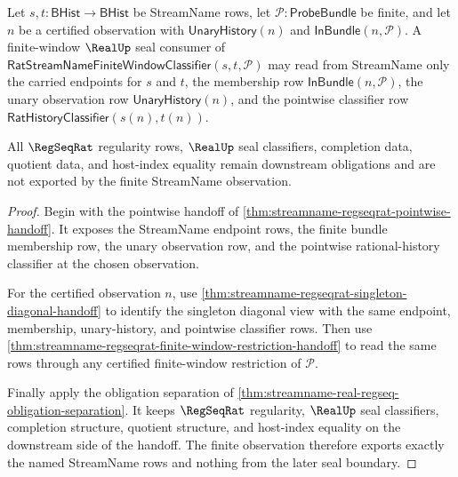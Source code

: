 \begin{theorem}
\label{thm:streamname-finite-observation-realup-seal-scope}
Let $s,t:\mathsf{BHist}\to\mathsf{BHist}$ be StreamName rows, let
$\mathcal P:\mathsf{ProbeBundle}$ be finite, and let $n$ be a certified
observation with $\mathsf{UnaryHistory}(n)$ and
$\mathsf{InBundle}(n,\mathcal P)$. A finite-window $\RealUp$ seal consumer of
$\mathsf{RatStreamNameFiniteWindowClassifier}(s,t,\mathcal P)$ may read from
StreamName only the carried endpoints for $s$ and $t$, the membership row
$\mathsf{InBundle}(n,\mathcal P)$, the unary observation row
$\mathsf{UnaryHistory}(n)$, and the pointwise classifier row
$\mathsf{RatHistoryClassifier}(s(n),t(n))$.

All $\RegSeqRat$ regularity rows, $\RealUp$ seal classifiers, completion
data, quotient data, and host-index equality remain downstream obligations
and are not exported by the finite StreamName observation.
\end{theorem}
\begin{proof}
Begin with the pointwise handoff of
\autoref{thm:streamname-regseqrat-pointwise-handoff}. It exposes the
StreamName endpoint rows, the finite bundle membership row, the unary
observation row, and the pointwise rational-history classifier at the chosen
observation.

For the certified observation $n$, use
\autoref{thm:streamname-regseqrat-singleton-diagonal-handoff} to identify the
singleton diagonal view with the same endpoint, membership, unary-history,
and pointwise classifier rows. Then use
\autoref{thm:streamname-regseqrat-finite-window-restriction-handoff} to read
the same rows through any certified finite-window restriction of
$\mathcal P$.

Finally apply the obligation separation of
\autoref{thm:streamname-real-regseq-obligation-separation}. It keeps
$\RegSeqRat$ regularity, $\RealUp$ seal classifiers, completion structure,
quotient structure, and host-index equality on the downstream side of the
handoff. The finite observation therefore exports exactly the named
StreamName rows and nothing from the later seal boundary.
\end{proof}

